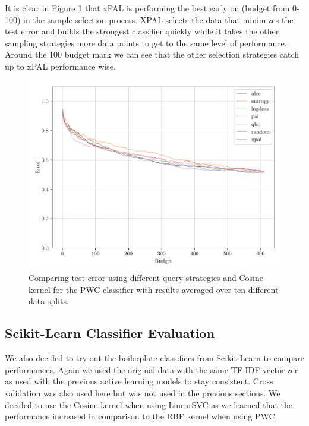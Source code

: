 It is clear in Figure \ref{fig:cos_avg_test_results} that xPAL is performing the best early on (budget from 0-100) in the sample selection process. XPAL selects the data that minimizes the test error and builds the strongest classifier quickly while it takes the other sampling strategies more data points to get to the same level of performance. Around the 100 budget mark we can see that the other selection strategies catch up to xPAL performance wise.

\begin{figure}[ht]
    \centering
    \includegraphics[width=\textwidth]{../img/plot_kernel_cos_averaged_test_results.pdf}
    \caption{Comparing test error using different query strategies and Cosine kernel for the PWC classifier with results averaged over ten different data splits.}
    \label{fig:cos_avg_test_results}
\end{figure}


\subsection{Scikit-Learn Classifier Evaluation}

We also decided to try out the boilerplate classifiers from Scikit-Learn to compare performances. Again we used the original data with the same TF-IDF vectorizer as used with the previous active learning models to stay consistent. Cross validation was also used here but was not used in the previous sections. We decided to use the Cosine kernel when using LinearSVC as we learned that the performance increased in comparison to the RBF kernel when using PWC. 

